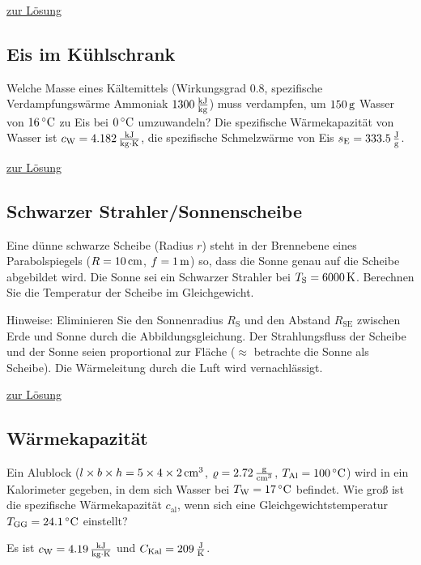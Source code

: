 \documentclass[a4paper]{scrartcl}
\begin{document}
\hyperref[lsg:Widerstaende]{zur Lösung}


\subsection{Eis im Kühlschrank}
\label{aufg:Kuehlschrank}
Welche Masse eines Kältemittels (Wirkungsgrad $0.8$, spezifische Verdampfungswärme Ammoniak $\unit[1300]{\frac{kJ}{kg}}$) muss verdampfen, um $\unit[150]{g}$ Wasser von $\unit[16]{^\circ C}$ zu Eis bei $\unit[0]{^\circ C}$ umzuwandeln? Die spezifische Wärmekapazität von Wasser ist $c_\text{W} = \unit[4.182]{\frac{kJ}{kg \cdot K}}$, die spezifische Schmelzwärme von Eis $s_\text{E} = \unit[333.5]{\frac{J}{g}}$.

\hyperref[lsg:Kuehlschrank]{zur Lösung}


\subsection{Schwarzer Strahler/Sonnenscheibe}
\label{aufg:SchwarzeSonne}
  Eine dünne schwarze Scheibe (Radius $r$) steht in der Brennebene eines Parabolspiegels ($R = \unit[10]{cm}$, $f=\unit[1]{m}$) so, dass die Sonne genau auf die Scheibe abgebildet wird. Die Sonne sei ein Schwarzer Strahler bei $T_\text{S} = \unit[6000]{K}$. Berechnen Sie die Temperatur der Scheibe im Gleichgewicht.

  Hinweise: Eliminieren Sie den Sonnenradius $R_\text{S}$ und den Abstand $R_\text{SE}$ zwischen Erde und Sonne durch die Abbildungsgleichung. Der Strahlungsfluss der Scheibe und der Sonne seien proportional zur Fläche ($\approx$ betrachte die Sonne als Scheibe). Die Wärmeleitung durch die Luft wird vernachlässigt.

\hyperref[lsg:SchwarzeSonne]{zur Lösung}


\subsection{Wärmekapazität}
\label{aufg:Waermekap}

Ein Alublock ($l\times b \times h = \unit[5\times 4 \times 2]{cm^3}$, $\varrho = \unit[2.72]{\frac{g}{cm^3}}$, $T_\text{Al} = \unit[100]{^\circ C}$) wird in ein Kalorimeter gegeben, in dem sich Wasser bei $T_\text{W} = \unit[17]{^\circ C}$ befindet. Wie groß ist die spezifische Wärmekapazität $c_\text{al}$, wenn sich eine Gleichgewichtstemperatur $T_\text{GG} = \unit[24.1]{^\circ C}$ einstellt?

Es ist $c_\text{W} = \unit[4.19]{\frac{kJ}{kg \cdot K}}$ und $C_\text{Kal} = \unit[209]{\frac{J}{K}}$.
\end{document}
